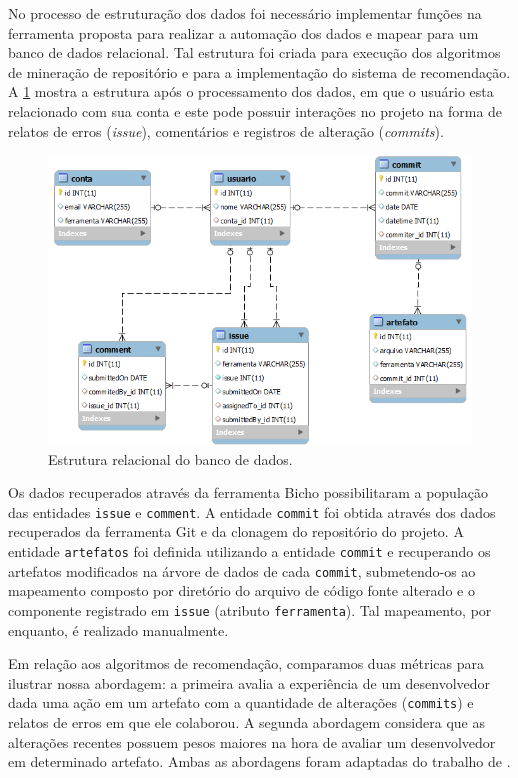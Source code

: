 \documentclass[oneside,brazil,a4paper]{normas-utf-tex}
\begin{document}
No processo de estruturação dos dados foi necessário implementar funções na ferramenta proposta para realizar a automação dos dados e mapear para um banco de dados relacional. Tal estrutura foi criada para execução dos algoritmos de mineração de repositório e para a implementação do sistema de recomendação. A \cref{fig:est} mostra a estrutura após o processamento dos dados, em que o usuário esta relacionado com sua conta e este pode possuir interações no projeto na forma de relatos de erros (\textit{issue}), comentários e registros de alteração (\textit{commits}).

\begin{figure}[!htb]
    \centering
    \includegraphics[width= .8\textwidth]{figuras/tabelas_banco}
    \caption{Estrutura relacional do banco de dados.}
    \label{fig:est}
\end{figure}


Os dados recuperados através da ferramenta Bicho possibilitaram a população das entidades \texttt{issue} e \texttt{comment}. A entidade \texttt{commit} foi obtida através dos dados recuperados da ferramenta Git e da clonagem do repositório do projeto. A entidade \texttt{artefatos} foi definida utilizando a entidade \texttt{commit} e recuperando os artefatos modificados na árvore de dados de cada \texttt{commit}, submetendo-os ao mapeamento composto por diretório do arquivo de código fonte alterado e o componente registrado em \texttt{issue} (atributo \texttt{ferramenta}). Tal mapeamento, por enquanto, é realizado manualmente.

Em relação aos algoritmos de recomendação, comparamos duas métricas para ilustrar nossa abordagem: a primeira avalia a experiência de um desenvolvedor dada uma ação em um artefato com a quantidade de alterações (\texttt{commits}) e relatos de erros em que ele colaborou. A segunda abordagem considera que  as alterações recentes possuem pesos maiores na hora de avaliar um desenvolvedor em determinado artefato. Ambas as abordagens foram adaptadas do trabalho de .
\end{document}
